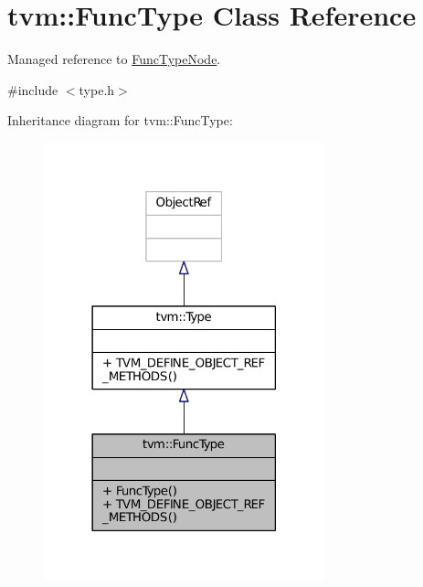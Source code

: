 \hypertarget{classtvm_1_1FuncType}{}\section{tvm\+:\+:Func\+Type Class Reference}
\label{classtvm_1_1FuncType}


Managed reference to \hyperlink{classtvm_1_1FuncTypeNode}{Func\+Type\+Node}.  




{\ttfamily \#include $<$type.\+h$>$}



Inheritance diagram for tvm\+:\+:Func\+Type\+:
\nopagebreak
\begin{figure}[H]
\begin{center}
\leavevmode
\includegraphics[width=230pt]{classtvm_1_1FuncType__inherit__graph}
\end{center}
\end{figure}


